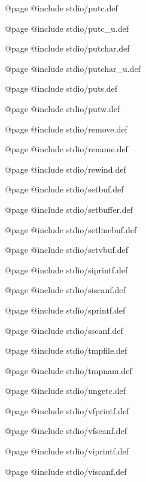 @page
@include stdio/putc.def

@page
@include stdio/putc_u.def

@page
@include stdio/putchar.def

@page
@include stdio/putchar_u.def

@page
@include stdio/puts.def

@page
@include stdio/putw.def

@page
@include stdio/remove.def

@page
@include stdio/rename.def

@page
@include stdio/rewind.def

@page
@include stdio/setbuf.def

@page
@include stdio/setbuffer.def

@page
@include stdio/setlinebuf.def

@page
@include stdio/setvbuf.def

@page
@include stdio/siprintf.def

@page
@include stdio/siscanf.def

@page
@include stdio/sprintf.def

@page
@include stdio/sscanf.def

@page
@include stdio/tmpfile.def

@page
@include stdio/tmpnam.def

@page
@include stdio/ungetc.def

@page
@include stdio/vfprintf.def

@page
@include stdio/vfscanf.def

@page
@include stdio/viprintf.def

@page
@include stdio/viscanf.def
